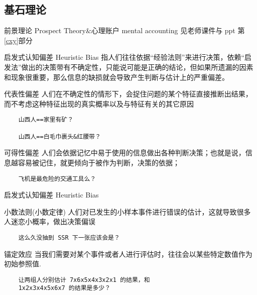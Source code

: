 \documentclass[presentation]{beamer}
\begin{document}
\subsection{基石理论}
\begin{frame}{前景理论 Prospect Theory\&心理账户 mental accounting}
	见老师课件与 ppt 第\ref{cxy}部分
\end{frame}
\begin{frame}[fragile]{启发式认知偏差 Heuristic Bias}
	指人们往往依据“经验法则”来进行决策，依赖“启发法”做出的决策带有不确定性，只能说可能是正确的结论，但如果所遗漏的因素和现象很重要，那么信息的缺损就会导致产生判断与估计上的严重偏差。
	\begin{block}{代表性偏差}
		人们在不确定性的情形下，会捉住问题的某个特征直接推断出结果，而不考虑这种特征出现的真实概率以及与特征有关的其它原因
		\begin{verbatim}
    山西人==家里有矿？

    山西人==白毛巾裹头&红腰带？
    \end{verbatim}
	\end{block}
	\begin{block}{可得性偏差}
		人们会依据记忆中易于使用的信息做出各种判断决策；也就是说，信息越容易被记住，就更倾向于被作为判断，决策的依据；
		\begin{verbatim}
    飞机是最危险的交通工具么？
    \end{verbatim}
	\end{block}
\end{frame}
\begin{frame}[fragile]{启发式认知偏差 Heuristic Bias}
	\begin{block}{小数法则(小数定律)}
		人们对已发生的小样本事件进行错误的估计，这就导致很多人迷恋小概率，做出决策偏误
		\begin{verbatim}
    这么久没抽到 SSR 下一张应该会是？
    \end{verbatim}
	\end{block}

	\begin{block}{锚定效应}
		当我们需要对某个事件或者人进行评估时，往往会以某些特定数值作为初始参照值.
		\begin{verbatim}
    让两组人分别估计 7x6x5x4x3x2x1 的结果，和
    1x2x3x4x5x6x7 的结果是多少？
    \end{verbatim}
	\end{block}
\end{frame}


\end{document}
